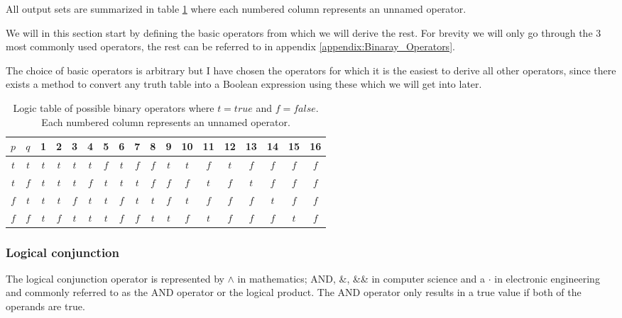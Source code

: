             All output sets are summarized in table \ref{LogicTable:PossibleOperators} where each numbered column represents an unnamed operator. 
            
            We will in this section start by defining the basic operators from which we will derive the rest. For brevity we will only go through the 3 most commonly used operators, the rest can be referred to in appendix \ref{appendix:Binaray_Operators}.  
            
            The choice of basic operators is arbitrary but I have chosen the operators for which it is the easiest to derive all other operators, since there exists a method to convert any truth table into a Boolean expression using these which we will get into later.
             
            
            \begin{table}[h!]
                \centering
                \begin{tabular}{|c|c||c|c|c|c|c|c|c|c|c|c|c|c|c|c|c|c|}
                	\hline
                	$p$ & $q$ &  1  &  2  &  3  &  4  &  5  &  6  &  7  &  8  &  9  & 10  & 11  & 12  & 13  & 14  & 15  & 16  \\ \hline
                	$t$ & $t$ & $t$ & $t$ & $t$ & $t$ & $f$ & $t$ & $f$ & $f$ & $t$ & $t$ & $f$ & $t$ & $f$ & $f$ & $f$ & $f$ \\ \hline
                	$t$ & $f$ & $t$ & $t$ & $t$ & $f$ & $t$ & $t$ & $t$ & $f$ & $f$ & $f$ & $t$ & $f$ & $t$ & $f$ & $f$ & $f$ \\ \hline
                	$f$ & $t$ & $t$ & $t$ & $f$ & $t$ & $t$ & $f$ & $t$ & $t$ & $f$ & $t$ & $f$ & $f$ & $f$ & $t$ & $f$ & $f$ \\ \hline
                	$f$ & $f$ & $t$ & $f$ & $t$ & $t$ & $t$ & $f$ & $f$ & $t$ & $t$ & $f$ & $t$ & $f$ & $f$ & $f$ & $t$ & $f$ \\ \hline
                \end{tabular} 
                \caption{Logic table of possible binary operators where $t=true$ and $f=false$. Each numbered column represents an unnamed operator.}
                \label{LogicTable:PossibleOperators}
            \end{table}
        
            \subsubsection{Logical conjunction}
        
                The logical conjunction operator is represented by $\wedge$ in mathematics; AND, \&, \&\& in computer science and a $\cdot$ in electronic engineering and commonly referred to as the AND operator or the logical product. The AND operator only results in a true value if both of the operands are true.
                
